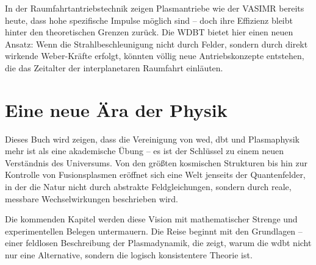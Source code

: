 In der Raumfahrtantriebstechnik zeigen Plasmantriebe wie der VASIMR bereits heute, dass hohe spezifische Impulse möglich sind – doch ihre Effizienz bleibt hinter den theoretischen
Grenzen zurück. Die WDBT bietet hier einen neuen Ansatz: Wenn die Strahlbeschleunigung nicht durch Felder, sondern durch direkt wirkende Weber-Kräfte erfolgt, könnten völlig neue
Antriebskonzepte entstehen, die das Zeitalter der interplanetaren Raumfahrt einläuten.

\section{Eine neue Ära der Physik}
Dieses Buch wird zeigen, dass die Vereinigung von \gls{wed}, \gls{dbt} und Plasmaphysik mehr ist als eine akademische Übung – es ist der Schlüssel zu
einem neuen Verständnis des Universums. Von den größten kosmischen Strukturen bis hin zur Kontrolle von Fusionsplasmen eröffnet sich eine Welt jenseits der Quantenfelder, in der
die Natur nicht durch abstrakte Feldgleichungen, sondern durch reale, messbare Wechselwirkungen beschrieben wird.

Die kommenden Kapitel werden diese Vision mit mathematischer Strenge und experimentellen Belegen untermauern. Die Reise beginnt mit den Grundlagen – einer feldlosen Beschreibung
der Plasmadynamik, die zeigt, warum die \gls{wdbt} nicht nur eine Alternative, sondern die logisch konsistentere Theorie ist.
